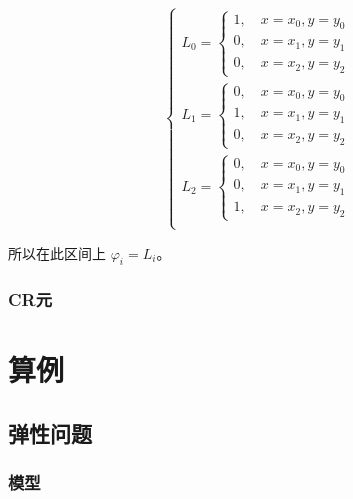 \documentclass[a4paper,UTF8,titlepage]{ctexart}
\begin{document}
$$
\begin{cases}
	L_0 = \begin{cases}
		1, \quad x = x_0, y = y_0 \\
		0, \quad x = x_1, y = y_1 \\
		0, \quad x = x_2, y = y_2
	\end{cases} \\
	L_1 = \begin{cases}
		0, \quad x = x_0, y = y_0 \\
		1, \quad x = x_1, y = y_1 \\
		0, \quad x = x_2, y = y_2
	\end{cases} \\
	L_2 = \begin{cases}
		0, \quad x = x_0, y = y_0 \\
		0, \quad x = x_1, y = y_1 \\
		1, \quad x = x_2, y = y_2
	\end{cases} \\
\end{cases}
$$

所以在此区间上 $\varphi_i = L_i$。

\subsubsection{CR元}

\section{算例}

\subsection{弹性问题}

\subsubsection{模型}
\end{document}
